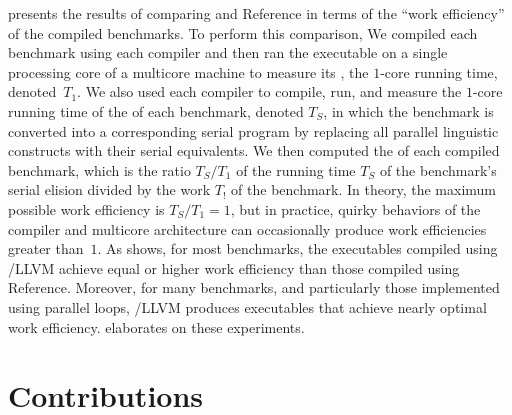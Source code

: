  presents the results of comparing \tapirllvm
and Reference in terms of the ``work efficiency'' of the compiled
benchmarks.  To perform this comparison, We compiled each benchmark
using each compiler and then ran the executable on a single processing
core of a multicore machine to measure its , the $1$-core
running time, denoted~$T_1$.  We also used each compiler to compile,
run, and measure the $1$-core running time of the  \cite{FrigoLeRa98} of each benchmark, denoted $T_S$, in
which the benchmark is converted into a corresponding serial program
by replacing all parallel linguistic constructs with their serial
equivalents.  We then computed the  of each
compiled benchmark, which is the ratio $T_S/T_1$ of the running time
$T_S$ of the benchmark's serial elision divided by the work $T_!$ of
the benchmark.  In theory, the maximum possible work efficiency is
$T_S/T_1 = 1$, but in practice, quirky behaviors of the compiler and
multicore architecture can occasionally produce work efficiencies
greater than~$1$.  As  shows, for most
benchmarks, the executables compiled using \tapir/LLVM achieve equal
or higher work efficiency than those compiled using Reference.
Moreover, for many benchmarks, and particularly those implemented
using parallel loops, \tapir/LLVM produces executables that achieve
nearly optimal work efficiency.   elaborates on these
experiments.


\section{Contributions} 

